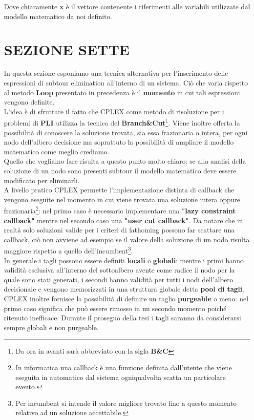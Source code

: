 \documentclass[11pt]{article}
\begin{document}
Dove chiaramente \textbf{x} è il vettore contenente i riferimenti alle variabili utilizzate dal modello matematico da noi definito.

\section*{SEZIONE SETTE}
\label{sec:SezioneSetteS}

In questa sezione esponiamo una tecnica alternativa per l'inserimento delle espressioni di subtour elimination all'interno di un sistema. Ciò che varia rispetto al metodo \textbf{Loop} presentato in precedenza è il \textbf{momento} in cui tali espressioni vengono definite.\\
L'idea è di sfruttare il fatto che CPLEX come metodo di risoluzione per i problemi di \textbf{PLI} utilizza la tecnica del \textbf{Branch\&Cut}\footnote{Da ora in avanti sarà abbreviato con la sigla \textbf{B\&C}}. Viene inoltre offerta la possibilità di conoscere la soluzione trovata, sia essa frazionaria o intera, per ogni nodo dell'albero decisione ma soprattuto la possibilità di ampliare il modello matematico come meglio crediamo.\\
Quello che vogliamo fare risulta a questo punto molto chiaro: se alla analisi della soluzione di un nodo sono presenti subtour il modello matematico deve essere modificato per eliminarli.\\
A livello pratico CPLEX permette l'implementazione distinta di callback che vengono eseguite nel momento in cui viene trovata una soluzione intera oppure frazionaria\footnote{In informatica una callback è una funzione definita dall'utente che viene eseguita in automatico dal sistema ogniqualvolta scatta un particolare evento.}: nel primo caso è necessario implementare una \textbf{"lazy constraint callback"} mentre nel secondo caso una \textbf{"user cut callback"}. Da notare che in realtà solo soluzioni valide per i criteri di fathoming possono far scattare una callback, ciò non avviene ad esempio se il valore della soluzione di un nodo risulta maggiore rispetto a quello dell'incumbent\footnote{Per incumbent si intende il valore migliore trovato fino a questo momento relativo ad un soluzione accettabile.}.\\
In generale i tagli possono essere definiti \textbf{locali} o \textbf{globali}: mentre i primi hanno validità esclusiva all'interno del sottoalbero avente come radice il nodo per la quale sono stati generati, i secondi hanno validità per tutti i nodi dell'albero decisionale e vengono memorizzati in una struttura globale detta \textbf{pool di tagli}. CPLEX inoltre fornisce la possibilità di definire un taglio \textbf{purgeable} o meno: nel primo caso significa che può essere rimosso in un secondo momento poiché ritenuto inefficace. Durante il proseguo della tesi i tagli saranno da considerarsi sempre globali e non purgeable.
\end{document}
